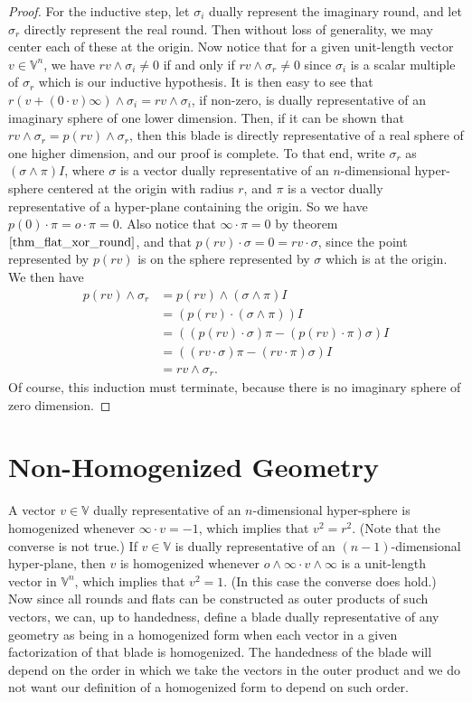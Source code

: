 \documentclass[12pt]{article}
\newcommand{\V}{\mathbb{V}}
\newcommand{\nvao}{o}
\newcommand{\nvai}{\infty}
\begin{document}
\begin{proof}
For the inductive step, let $\sigma_i$ dually represent the imaginary round,
and let $\sigma_r$ directly represent the real round.  Then without loss of generality,
we may center each of these at the origin.  Now notice that for a given unit-length
vector $v\in\V^n$, we have $rv\wedge\sigma_i\neq 0$ if and only if $rv\wedge\sigma_r\neq 0$
since $\sigma_i$ is a scalar multiple of $\sigma_r$ which is our inductive hypothesis.
It is then easy to see that $r(v+(0\cdot v)\nvai)\wedge\sigma_i=rv\wedge\sigma_i$, if non-zero,
is dually representative of an imaginary sphere of one lower dimension.  Then, if
it can be shown that $rv\wedge\sigma_r=p(rv)\wedge\sigma_r$, then this blade is directly representative
of a real sphere of one higher dimension, and our proof is complete.  To that end,
write $\sigma_r$ as $(\sigma\wedge\pi)I$, where $\sigma$ is a vector dually representative
of an $n$-dimensional hyper-sphere centered at the origin with radius $r$, and
$\pi$ is a vector dually representative of a hyper-plane containing the origin.
So we have $p(0)\cdot\pi=\nvao\cdot\pi=0$.  Also notice that $\nvai\cdot\pi=0$
by theorem $\eqref{thm_flat_xor_round}$, and that $p(rv)\cdot\sigma=0=rv\cdot\sigma$, since
the point represented by $p(rv)$ is on the sphere represented by $\sigma$ which is at the origin.  We then have
\begin{align*}
p(rv)\wedge\sigma_r &= p(rv)\wedge(\sigma\wedge\pi)I \\
 &= (p(rv)\cdot(\sigma\wedge\pi))I \\
 &= ((p(rv)\cdot\sigma)\pi - (p(rv)\cdot\pi)\sigma)I \\
 &= ((rv\cdot\sigma)\pi - (rv\cdot\pi)\sigma)I \\
 &= rv\wedge\sigma_r.
\end{align*}
Of course, this induction must terminate, because there is no imaginary sphere
of zero dimension.
\end{proof}

\section{Non-Homogenized Geometry}

A vector $v\in\V$ dually representative of an $n$-dimensional hyper-sphere
is homogenized whenever $\nvai\cdot v=-1$, which implies that $v^2=r^2$.
(Note that the converse is not true.)
If $v\in\V$ is dually representative
of an $(n-1)$-dimensional hyper-plane, then $v$ is homogenized whenever
$\nvao\wedge\nvai\cdot v\wedge\nvai$ is a unit-length vector in $\V^n$,
which implies that $v^2=1$.  (In this case the converse does hold.)
Now since all rounds and flats can be constructed as outer products of
such vectors, we can, up to handedness, define a blade dually representative
of any geometry as being in a homogenized form when each vector in a given factorization
of that blade is homogenized.  The handedness of the blade will depend
on the order in which we take the vectors in the outer product and we
do not want our definition of a homogenized form to depend on such order.
\end{document}
